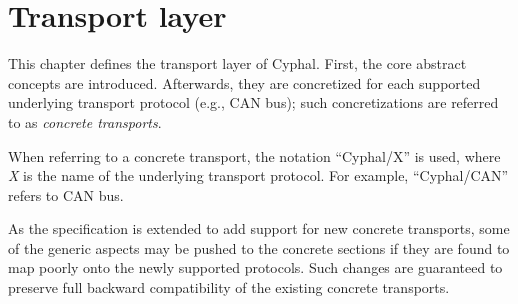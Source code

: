 \chapter{Transport layer}\label{sec:transport}

This chapter defines the transport layer of Cyphal.
First, the core abstract concepts are introduced.
Afterwards, they are concretized for each supported underlying transport protocol (e.g., CAN bus);
such concretizations are referred to as \emph{concrete transports}.

When referring to a concrete transport, the notation ``Cyphal/X'' is used,
where \emph{X} is the name of the underlying transport protocol.
For example, ``Cyphal/CAN'' refers to CAN bus.

As the specification is extended to add support for new concrete transports,
some of the generic aspects may be pushed to the concrete sections
if they are found to map poorly onto the newly supported protocols.
Such changes are guaranteed to preserve full backward compatibility of the existing concrete transports.

\clearpage
\clearpage
